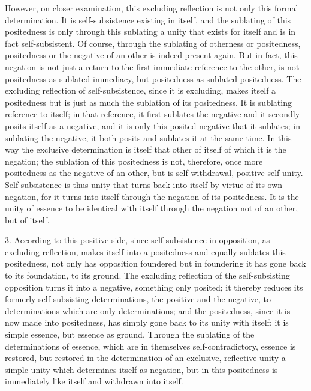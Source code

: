 However, on closer examination,
this excluding reflection is not only
this formal determination.
It is self-subsistence existing in itself,
and the sublating of this positedness
is only through this sublating a unity that
exists for itself and is in fact self-subsistent.
Of course, through the sublating of otherness or positedness,
positedness or the negative of an other is indeed present again.
But in fact, this negation is not just a return to the first
immediate reference to the other,
is not positedness as sublated immediacy,
but positedness as sublated positedness.
The excluding reflection of self-subsistence,
since it is excluding,
makes itself a positedness but is just as much
the sublation of its positedness.
It is sublating reference to itself;
in that reference, it first sublates the negative
and it secondly posits itself as a negative,
and it is only this posited negative that it sublates;
in sublating the negative,
it both posits and sublates it at the same time.
In this way the exclusive determination is
itself that other of itself of which it is the negation;
the sublation of this positedness is not, therefore,
once more positedness as the negative of an other,
but is self-withdrawal, positive self-unity.
Self-subsistence is thus unity that turns back into itself
by virtue of its own negation,
for it turns into itself through the negation of its positedness.
It is the unity of essence to be identical with itself
through the negation not of an other, but of itself.

3. According to this positive side,
since self-subsistence in opposition,
as excluding reflection,
makes itself into a positedness
and equally sublates this positedness,
not only has opposition foundered
but in foundering it has gone back
to its foundation, to its ground.
The excluding reflection of
the self-subsisting opposition turns it
into a negative, something only posited;
it thereby reduces its formerly self-subsisting determinations,
the positive and the negative,
to determinations which are only determinations;
and the positedness, since it is now made into positedness,
has simply gone back to its unity with itself;
it is simple essence, but essence as ground.
Through the sublating of the determinations of essence,
which are in themselves self-contradictory,
essence is restored,
but restored in the determination of
an exclusive, reflective unity
a simple unity which determines itself as negation,
but in this positedness is immediately like itself
and withdrawn into itself.

